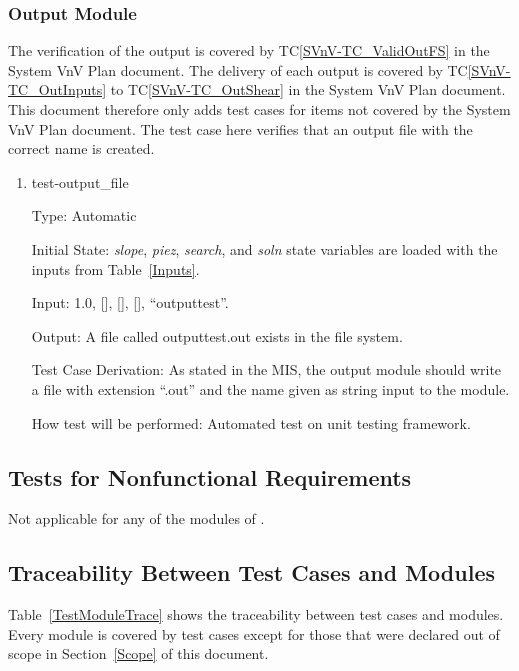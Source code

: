 \documentclass[12pt, titlepage]{article}
\newcommand{\tcref}[1]{TC\ref{#1}}
\newcounter{utestnum} %
\begin{document}
\subsubsection{Output Module}
The verification of the output is covered by \tcref{SVnV-TC_ValidOutFS} in the 
System VnV Plan document. The delivery of each output is covered by 
\tcref{SVnV-TC_OutInputs} to \tcref{SVnV-TC_OutShear} in the System VnV Plan 
document. This document therefore only adds test cases for items not covered by 
the System VnV Plan document. The test case here verifies that an output file 
with the correct name is created.

\begin{enumerate}[label=TC\arabic*:,ref={\arabic*}]
	
	\item [TC\refstepcounter{utestnum}\theutestnum: \label{TC_OutputFile}] 
	test-output\_file
	
	Type: Automatic
	
	Initial State: \textit{slope}, \textit{piez}, \textit{search}, and 
	\textit{soln} state variables are loaded with the inputs from 
	Table~\ref{Inputs}.
	
	Input: 1.0, [], [], [], ``outputtest''.
	
	Output: A file called outputtest.out exists in the file system.
	
	Test Case Derivation: As stated in the MIS, the output module should write 
	a file with extension ``.out'' and the name given as string input to the 
	module.
	
	How test will be performed: Automated test on unit testing framework.
	
\end{enumerate}

\subsection{Tests for Nonfunctional Requirements}

Not applicable for any of the modules of \progname{}.

\subsection{Traceability Between Test Cases and Modules}

Table~\ref{TestModuleTrace} shows the traceability between test cases and 
modules. Every module is covered by test cases except for those that were 
declared out of scope in Section~\ref{Scope} of this document.
\end{document}
